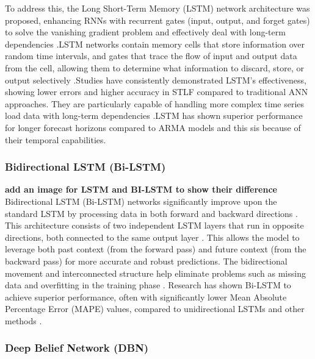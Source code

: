  To address this, the Long Short-Term Memory (LSTM) network architecture was proposed, enhancing RNNs with recurrent gates (input, output, and forget gates) to solve the vanishing gradient problem and effectively deal with long-term dependencies \cite{wang2023}.LSTM networks contain memory cells that store information over random time intervals, and gates that trace the flow of input and output data from the cell, allowing them to determine what information to discard, store, or output selectively \cite{he2019hybrid}.Studies have consistently demonstrated LSTM's effectiveness, showing lower errors and higher accuracy in STLF compared to traditional ANN approaches. They are particularly capable of handling more complex time series load data with long-term dependencies \cite{rafi2021short}.LSTM has shown superior performance for longer forecast horizons compared to ARMA models \cite{tshipata2024multi} and this sis because of their temporal capabilities.
 
 \subsubsection{ Bidirectional LSTM (Bi-LSTM)}
 \textbf{add an image for LSTM and BI-LSTM to show their difference} \\
 Bidirectional LSTM (Bi-LSTM) networks significantly improve upon the standard LSTM by processing data in both forward and backward directions \cite{wang2023short}. This architecture consists of two independent LSTM layers that run in opposite directions, both connected to the same output layer \cite{moradzadeh2021deep}. This allows the model to leverage both past context (from the forward pass) and future context (from the backward pass) for more accurate and robust predictions. The bidirectional movement and interconnected structure help eliminate problems such as missing data and overfitting in the training phase \cite{moradzadeh2021deep}. Research has shown Bi-LSTM to achieve superior performance, often with significantly lower Mean Absolute Percentage Error (MAPE) values, compared to unidirectional LSTMs and other methods \cite{ibrahim2022machine}.
 
 \subsubsection{Deep Belief Network (DBN)}

